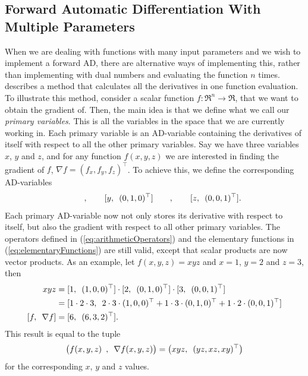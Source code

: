 \subsection{Forward Automatic Differentiation With Multiple Parameters}
\label{sec:FADWithMultipleParameters}
When we are dealing with functions with many input parameters and we wish to implement a forward AD, there are alternative ways of implementing this, rather than implementing with dual numbers and evaluating the function $n$ times.  \citet{doi:10.1137/080743627} describes a method that calculates all the derivatives in one function evaluation. To illustrate this method, consider a scalar function $f: \Re^n \rightarrow \Re$, that we want to obtain the gradient of. Then, the main idea is that we define what we call our \textit{primary variables}. This is all the variables in the space that we are currently working in. Each primary variable is an AD-variable containing the derivatives of itself with respect to all the other primary variables. Say we have three variables $x$, $y$ and $z$, and for any function $f(x,y,z)$ we are interested in finding the gradient of $f$, $\nabla f=(f_x, f_y, f_z)^\top$. To achieve this, we define the corresponding AD-variables
\begin{equation*}
    [\adpair{x}{(1,0,0)^\top}]\hspace{2em},\hspace{2em}
    [\adpair{y}{(0,1,0)^\top}]\hspace{2em},\hspace{2em}
    [\adpair{z}{(0,0,1)^\top}].
\end{equation*}
Each primary AD-variable now not only stores its derivative with respect to itself, but also the gradient with respect to all other primary variables. The operators defined in (\ref{eq:arithmeticOperators}) and the elementary functions in (\ref{eq:elementaryFunctions}) are still valid, except that scalar products are now vector products. As an example, let $f(x,y,z) = xyz$ and $x = 1$, $y = 2$ and $z = 3$, then
\begin{align*}
    xyz &= [\adpair{1}{(1,0,0)^\top}]\cdot [\adpair{2}{(0,1,0)^\top}]\cdot
    [\adpair{3}{(0,0,1)^\top}] \\
    &=[\adpair{1\cdot 2\cdot 3}{2\cdot3\cdot(1,0,0)^\top + 1\cdot3\cdot(0,1,0)^\top + 1\cdot2\cdot(0,0,1)^\top}] \\
    [\adpair{f}{\nabla f}] &= [\adpair{6}{(6,3,2)^\top}].
\end{align*}
This result is equal to the tuple
\begin{equation*}
    \big(f(x,y,z) \hspace{0.5em},\hspace{0.5em} \nabla f(x,y,z)\big) = \big(xyz ,\hspace{0.5em} (yz,xz,xy)^\top\big)
\end{equation*}
for the corresponding $x$, $y$ and $z$ values. 
